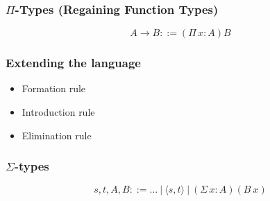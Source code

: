 \documentclass[utf8x]{beamer}
\begin{document}
\begin{frame}
\frametitle{$\Pi$-Types (Regaining Function Types)}

$$A \to B ::= (\Pi \, x : A)B$$

\begin{prooftree}
\end{prooftree}

\begin{prooftree}
\end{prooftree}

\begin{prooftree}
\end{prooftree}

\end{frame}

\begin{frame}
\frametitle{Extending the language}
\begin{itemize}
\item Formation rule
\item Introduction rule
\item Elimination rule
\end{itemize}
\end{frame}

\begin{frame}
\frametitle{$\Sigma$-types}

$$s , t , A , B ::= \ldots \ | \ \langle s , t \rangle \ | \ (\Sigma \, x : A)(B \ x)$$

\begin{prooftree}
\end{prooftree}

\begin{prooftree}
\end{prooftree}

\begin{prooftree}
\end{prooftree}
\end{frame}
\end{document}
